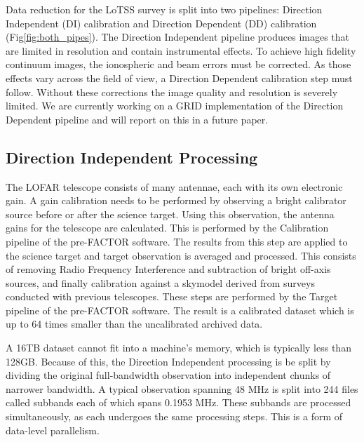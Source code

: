 Data reduction for the LoTSS survey is split into two pipelines: Direction Independent (DI) calibration and Direction Dependent (DD) calibration (Fig\ref{fig:both_pipes}). The Direction Independent pipeline\cite{prefactor}\cite{van2016lofar} produces images that are limited in resolution and contain instrumental effects\cite{lotss}. To achieve high fidelity continuum images, the ionospheric and beam errors must be corrected\cite{lofar_calib}. As those effects vary across the field of view, a Direction Dependent calibration step must follow. Without these corrections the image quality and resolution is severely limited\cite{van2016lofar}.  We are currently working on a GRID implementation of the Direction Dependent pipeline and will report on this in a future paper.


\subsection{Direction Independent Processing}\label{sec:dirin_process}

The LOFAR telescope consists of many antennae, each with its own electronic gain. A gain calibration needs to be performed by observing a bright calibrator source before or after the science target\cite{lofar_calib}. Using this observation, the antenna gains for the telescope are calculated. This is performed by the Calibration pipeline of the pre-FACTOR software\cite{prefactor}.  The results from this step are applied to the science target and target observation is averaged  and processed. This consists of removing Radio Frequency Interference and subtraction of bright off-axis sources, and finally calibration against a skymodel derived from surveys conducted with previous telescopes\cite{lofar_calib}\cite{van2016lofar}. These steps are performed by the Target pipeline of the pre-FACTOR software\cite{prefactor}. The result is a calibrated dataset which is up to 64 times smaller than the uncalibrated archived data.

A 16TB dataset cannot fit into a machine's memory, which is typically less than 128GB. Because of this,  the Direction Independent processing is be split by dividing the original full-bandwidth observation into independent chunks of narrower bandwidth. A typical observation spanning 48 MHz is split into 244 files called subbands each of which spans 0.1953 MHz.  These subbands are processed simultaneously, as each undergoes the same processing steps. This is a form of data-level parallelism. 


